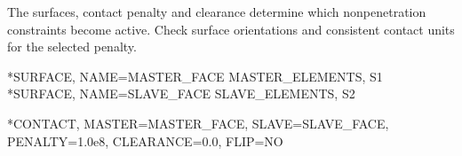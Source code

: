 The surfaces, contact penalty and clearance determine which nonpenetration constraints become active. Check surface orientations and consistent contact units for the selected penalty.

\exampleheading
\begin{inputdeck}
*SURFACE, NAME=MASTER_FACE
MASTER_ELEMENTS, S1
*SURFACE, NAME=SLAVE_FACE
SLAVE_ELEMENTS, S2

*CONTACT, MASTER=MASTER_FACE,
 SLAVE=SLAVE_FACE,
 PENALTY=1.0e8,
 CLEARANCE=0.0, FLIP=NO
\end{inputdeck}

